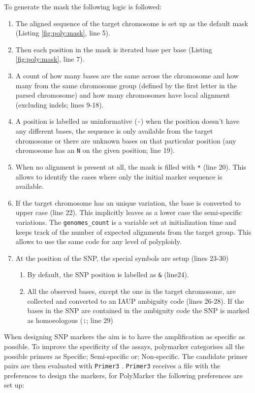To generate the mask the following logic is followed:
\begin{enumerate}
\item The aligned sequence of the target chromosome is set up as the default mask (Listing \ref{fig:poly:mask}, line 5).
\item Then each position in the mask is iterated base per base (Listing \ref{fig:poly:mask}, line 7).
\item A count of how many bases are the same across the chromosome and how many from the same chromosome group (defined by the first letter in the parsed chromosome) and how many chromosomes have local alignment (excluding \acrshort{indels}; lines 9-18).
\item  A position is labelled as uninformative (\verb|-|) when the position doesn't have any different bases, the sequence is only available from the target chromosome or there are unknown bases on that particular position (any chromosome has an \verb|N| on the given position; line 19).
\item When no alignment is present at all, the mask is filled with \verb|*| (line 20). This allows to identify the cases where only the initial marker sequence is available.
\item If the target chromosome has an unique variation, the base is converted to upper case (line 22). This implicitly leaves as a lower case the semi-specific variations. The \verb|genomes_count| is a variable set at initialization time and keeps track of the number of expected alignments from the target group. This allows to use the same code for any level of polyploidy.  
\item At the position of the SNP, the special symbols are setup (lines 23-30)
\begin{enumerate}
\item By default, the SNP position is labelled as \verb|&| (line24).
\item All the observed bases, except the one in the target chromosome, are collected and converted to an IAUP ambiguity code \citep{Cornish-Bowden1985} (lines 26-28). If the bases in the SNP are contained in the ambiguity code the SNP is marked as homoeologous (\verb|:|; line 29)
\end{enumerate}
\end{enumerate}

When designing SNP markers the aim is to have the amplification as specific as possible. 
To improve the specificity of the assays, polymarker categorises all the possible primers as Specific; Semi-specific or; Non-specific. 
The candidate primer pairs are then evaluated with \texttt{Primer3} \citep{Rozen}. 
\texttt{Primer3} receives a file with the preferences to design the markers, for PolyMarker the following preferences are set up: 

